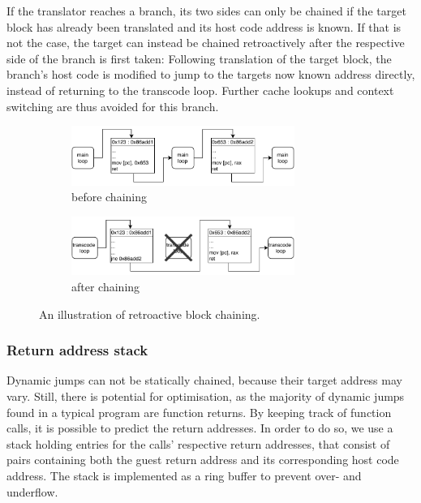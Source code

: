 If the translator reaches a branch, its two sides can only be chained if the target block has already been translated and its host code address is known.
If that is not the case, the target can instead be chained retroactively after the respective side of the branch is first taken: Following translation of the target block, the branch's host code is modified to jump to the targets now known address directly, instead of returning to the transcode loop.
Further cache lookups and context switching are thus avoided for this branch.

\begin{figure}[h]
	\begin{center}
		\begin{subfigure}[b]{\textwidth}
			\centering
			\includegraphics[width=0.8\textwidth]{media/chaining-unchained.pdf}
			\caption{before chaining}
		\end{subfigure}
		\begin{subfigure}[b]{\textwidth}
			\centering
			\includegraphics[width=0.8\textwidth]{media/chaining-chained.pdf}
			\caption{after chaining}
		\end{subfigure}
	\end{center}
	
	\caption[Block chaining illustration]%
	{An illustration of retroactive block chaining.}
\end{figure}


\subsubsection{Return address stack}
\label{sec:return-address-stack}
Dynamic jumps can not be statically chained, because their target address may vary.
Still, there is potential for optimisation, as the majority of dynamic jumps found in a typical program are function returns.
By keeping track of function calls, it is possible to predict the return addresses.
In order to do so, we use a stack holding entries for the calls' respective return addresses, that consist of pairs containing both the guest return address and its corresponding host code address.
The stack is implemented as a ring buffer to prevent over- and underflow.

